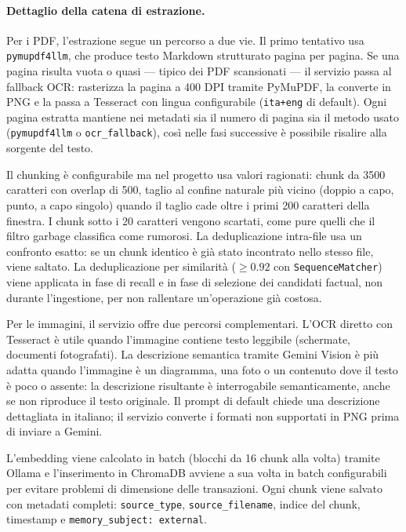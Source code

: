 \paragraph{Dettaglio della catena di estrazione.}

Per i PDF, l'estrazione segue un percorso a due vie. Il primo tentativo usa \texttt{pymupdf4llm}, che produce testo Markdown strutturato pagina per pagina. Se una pagina risulta vuota o quasi --- tipico dei PDF scansionati --- il servizio passa al fallback OCR: rasterizza la pagina a 400 DPI tramite PyMuPDF, la converte in PNG e la passa a Tesseract con lingua configurabile (\texttt{ita+eng} di default). Ogni pagina estratta mantiene nei metadati sia il numero di pagina sia il metodo usato (\texttt{pymupdf4llm} o \texttt{ocr\_fallback}), così nelle fasi successive è possibile risalire alla sorgente del testo.

Il chunking è configurabile ma nel progetto usa valori ragionati: chunk da 3500 caratteri con overlap di 500, taglio al confine naturale più vicino (doppio a capo, punto, a capo singolo) quando il taglio cade oltre i primi 200 caratteri della finestra. I chunk sotto i 20 caratteri vengono scartati, come pure quelli che il filtro garbage classifica come rumorosi. La deduplicazione intra-file usa un confronto esatto: se un chunk identico è già stato incontrato nello stesso file, viene saltato. La deduplicazione per similarità ($\geq 0.92$ con \texttt{SequenceMatcher}) viene applicata in fase di recall e in fase di selezione dei candidati factual, non durante l'ingestione, per non rallentare un'operazione già costosa.

Per le immagini, il servizio offre due percorsi complementari. L'OCR diretto con Tesseract è utile quando l'immagine contiene testo leggibile (schermate, documenti fotografati). La descrizione semantica tramite Gemini Vision è più adatta quando l'immagine è un diagramma, una foto o un contenuto dove il testo è poco o assente: la descrizione risultante è interrogabile semanticamente, anche se non riproduce il testo originale. Il prompt di default chiede una descrizione dettagliata in italiano; il servizio converte i formati non supportati in PNG prima di inviare a Gemini.

L'embedding viene calcolato in batch (blocchi da 16 chunk alla volta) tramite Ollama e l'inserimento in ChromaDB avviene a sua volta in batch configurabili per evitare problemi di dimensione delle transazioni. Ogni chunk viene salvato con metadati completi: \texttt{source\_type}, \texttt{source\_filename}, indice del chunk, timestamp e \texttt{memory\_subject: external}.

